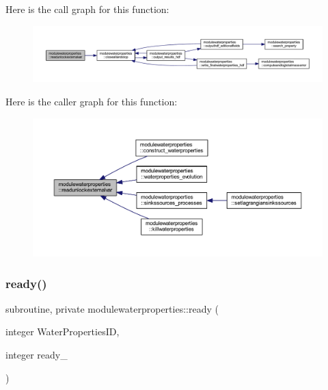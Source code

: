 Here is the call graph for this function\+:\nopagebreak
\begin{figure}[H]
\begin{center}
\leavevmode
\includegraphics[width=350pt]{namespacemodulewaterproperties_ac4ba6844cdc46e6fc258842be3a9e82b_cgraph}
\end{center}
\end{figure}
Here is the caller graph for this function\+:\nopagebreak
\begin{figure}[H]
\begin{center}
\leavevmode
\includegraphics[width=350pt]{namespacemodulewaterproperties_ac4ba6844cdc46e6fc258842be3a9e82b_icgraph}
\end{center}
\end{figure}
\mbox{\label{namespacemodulewaterproperties_ad54774dedce486739249cb10b4de21e2}} 
\subsubsection{\texorpdfstring{ready()}{ready()}}
{\footnotesize\ttfamily subroutine, private modulewaterproperties\+::ready (\begin{DoxyParamCaption}\item[{integer}]{Water\+Properties\+ID,  }\item[{integer}]{ready\+\_\+ }\end{DoxyParamCaption})\hspace{0.3cm}{\ttfamily [private]}}

